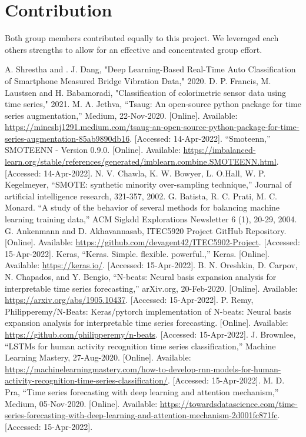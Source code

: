\documentclass[conference]{IEEEtran}
\begin{document}
\section{Contribution}
Both group members contributed equally to this project. We leveraged each others strengths to allow for an effective and concentrated group effort.
\begin{thebibliography}{00}
 A. Shrestha and . J. Dang, "Deep Learning-Based Real-Time Auto Classification of Smartphone Measured Bridge Vibration Data," 2020. 
 D. P. Francis, M. Laustsen and H. Babamoradi, "Classification of colorimetric sensor data using time series," 2021.
 M. A. Jethva, “Tsaug: An open-source python package for time series augmentation,” Medium, 22-Nov-2020. [Online]. Available: \url{https://mineshj1291.medium.com/tsaug-an-open-source-python-package-for-time-series-augmentation-85ab9890db16}. [Accessed: 14-Apr-2022]. 
 “Smoteenn,” SMOTEENN - Version 0.9.0. [Online]. Available: \url{https://imbalanced-learn.org/stable/references/generated/imblearn.combine.SMOTEENN.html}. [Accessed: 14-Apr-2022].
 N. V. Chawla, K. W. Bowyer, L. O.Hall, W. P. Kegelmeyer, “SMOTE: synthetic minority over-sampling technique,” Journal of artificial intelligence research, 321-357, 2002. 
 G. Batista, R. C. Prati, M. C. Monard. “A study of the behavior of several methods for balancing machine learning training data,” ACM Sigkdd Explorations Newsletter 6 (1), 20-29, 2004.
 G. Ankenmann and D. Akhavannasab, ITEC5920 Project GitHub Repository. [Online]. Available: \url{https://github.com/devagent42/ITEC5902-Project}. [Accessed: 15-Apr-2022]. 
 Keras, “Keras. Simple. flexible. powerful.,” Keras. [Online]. Available: \url{https://keras.io/}. [Accessed: 15-Apr-2022].
 B. N. Oreshkin, D. Carpov, N. Chapados, and Y. Bengio, “N-beats: Neural basis expansion analysis for interpretable time series forecasting,” arXiv.org, 20-Feb-2020. [Online]. Available: \url{https://arxiv.org/abs/1905.10437}. [Accessed: 15-Apr-2022]. 
 P. Remy, Philipperemy/N-Beats: Keras/pytorch implementation of N-beats: Neural basis expansion analysis for interpretable time series forecasting. [Online]. Available: \url{https://github.com/philipperemy/n-beats}. [Accessed: 15-Apr-2022]. 
 J. Brownlee, “LSTMs for human activity recognition time series classification,” Machine Learning Mastery, 27-Aug-2020. [Online]. Available: \url{https://machinelearningmastery.com/how-to-develop-rnn-models-for-human-activity-recognition-time-series-classification/}. [Accessed: 15-Apr-2022]. 
 M. D. Pra, “Time series forecasting with deep learning and attention mechanism,” Medium, 05-Nov-2020. [Online]. Available: \url{https://towardsdatascience.com/time-series-forecasting-with-deep-learning-and-attention-mechanism-2d001fc871fc}. [Accessed: 15-Apr-2022]. 
\end{thebibliography}
\end{document}
